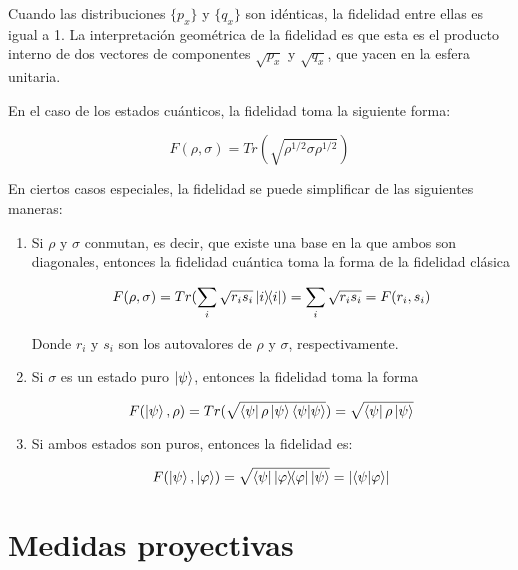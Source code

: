 Cuando las distribuciones $\{p_x\}$ y $\{q_x\}$ son idénticas, la fidelidad entre ellas es igual a 1. La interpretación geométrica de la fidelidad es que esta es el producto interno de dos vectores de componentes $\sqrt{p_x}$ y $\sqrt{q_x}$, que yacen en la esfera unitaria.

En el caso de los estados cuánticos, la fidelidad toma la siguiente forma:

\begin{equation}
    F(\rho, \sigma) = Tr(\sqrt{\rho^{1/2} \sigma \rho^{1/2}})
\end{equation}

En ciertos casos especiales, la fidelidad se puede simplificar de las siguientes maneras:

\begin{enumerate}
    \item Si $\rho$ y $\sigma$ conmutan, es decir, que existe una base en la que ambos son diagonales, entonces la fidelidad cuántica toma la forma de la fidelidad clásica

        \begin{equation}
            F(\rho, \sigma) = Tr(\sum\limits_i \sqrt{r_i s_i} \ketbra{i}{i}) = \sum\limits_i \sqrt{r_i s_i} = F(r_i, s_i)
        \end{equation}

        Donde $r_i$ y $s_i$ son los autovalores de $\rho$ y $\sigma$, respectivamente.

    \item Si $\sigma$ es un estado puro $\ket{\psi}$, entonces la fidelidad toma la forma

        \begin{equation}
            F(\ket{\psi}, \rho) = Tr(\sqrt{\bra{\psi} \rho \ket{\psi} \braket{\psi}{\psi}}) = \sqrt{\bra{\psi} \rho \ket{\psi}}
        \end{equation}

    \item Si ambos estados son puros, entonces la fidelidad es:

        \begin{equation}
            F(\ket{\psi}, \ket{\varphi}) = \sqrt{\bra{\psi} \ketbra{\varphi}{\varphi} \ket{\psi}} = \abs{\braket{\psi}{\varphi}}
        \end{equation}
\end{enumerate}

\section{Medidas proyectivas}

